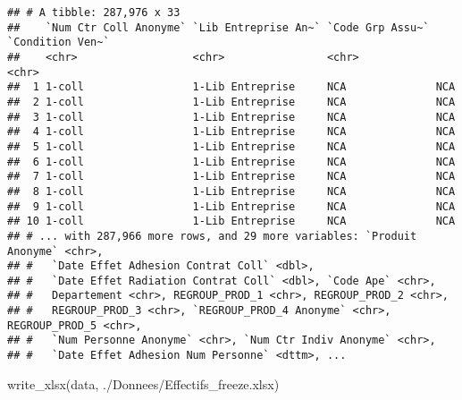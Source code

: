 \documentclass[
]{article}
\newenvironment{Shaded}{\begin{snugshade}}{\end{snugshade}}
\newcommand{\AttributeTok}[1]{\textcolor[rgb]{0.77,0.63,0.00}{#1}}
\newcommand{\ControlFlowTok}[1]{\textcolor[rgb]{0.13,0.29,0.53}{\textbf{#1}}}
\newcommand{\DecValTok}[1]{\textcolor[rgb]{0.00,0.00,0.81}{#1}}
\newcommand{\FunctionTok}[1]{\textcolor[rgb]{0.00,0.00,0.00}{#1}}
\newcommand{\NormalTok}[1]{#1}
\newcommand{\OtherTok}[1]{\textcolor[rgb]{0.56,0.35,0.01}{#1}}
\newcommand{\SpecialCharTok}[1]{\textcolor[rgb]{0.00,0.00,0.00}{#1}}
\newcommand{\StringTok}[1]{\textcolor[rgb]{0.31,0.60,0.02}{#1}}
\begin{document}
\begin{Shaded}
\end{Shaded}

\begin{verbatim}
## # A tibble: 287,976 x 33
##    `Num Ctr Coll Anonyme` `Lib Entreprise An~` `Code Grp Assu~` `Condition Ven~`
##    <chr>                  <chr>                <chr>            <chr>           
##  1 1-coll                 1-Lib Entreprise     NCA              NCA             
##  2 1-coll                 1-Lib Entreprise     NCA              NCA             
##  3 1-coll                 1-Lib Entreprise     NCA              NCA             
##  4 1-coll                 1-Lib Entreprise     NCA              NCA             
##  5 1-coll                 1-Lib Entreprise     NCA              NCA             
##  6 1-coll                 1-Lib Entreprise     NCA              NCA             
##  7 1-coll                 1-Lib Entreprise     NCA              NCA             
##  8 1-coll                 1-Lib Entreprise     NCA              NCA             
##  9 1-coll                 1-Lib Entreprise     NCA              NCA             
## 10 1-coll                 1-Lib Entreprise     NCA              NCA             
## # ... with 287,966 more rows, and 29 more variables: `Produit Anonyme` <chr>,
## #   `Date Effet Adhesion Contrat Coll` <dbl>,
## #   `Date Effet Radiation Contrat Coll` <dbl>, `Code Ape` <chr>,
## #   Departement <chr>, REGROUP_PROD_1 <chr>, REGROUP_PROD_2 <chr>,
## #   REGROUP_PROD_3 <chr>, `REGROUP_PROD_4 Anonyme` <chr>, REGROUP_PROD_5 <chr>,
## #   `Num Personne Anonyme` <chr>, `Num Ctr Indiv Anonyme` <chr>,
## #   `Date Effet Adhesion Num Personne` <dttm>, ...
\end{verbatim}

\begin{Shaded}
\begin{Highlighting}[]
\FunctionTok{write\_xlsx}\NormalTok{(data, }\StringTok{\textquotesingle{}./Donnees/Effectifs\_freeze.xlsx\textquotesingle{}}\NormalTok{)}
\end{Highlighting}
\end{Shaded}
\end{document}
